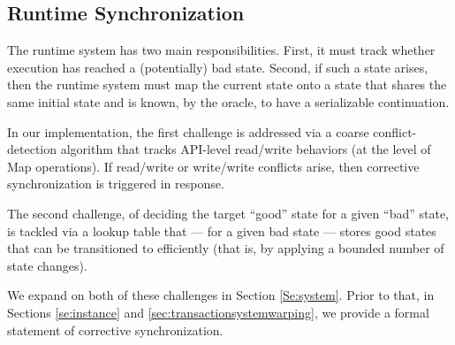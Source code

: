 \subsection{Runtime Synchronization} 

The runtime system has two main responsibilities. First, it must track whether execution has reached a (potentially) bad state. Second, if such a state arises, then the runtime system must map the current state onto a state that shares the same initial state and is known, by the oracle, to have a serializable continuation. 

In our implementation, the first challenge is addressed via a coarse conflict-detection algorithm that tracks API-level read/write behaviors (at the level of {\sf Map} operations). If read/write or write/write conflicts arise, then corrective synchronization is triggered in response. 

The second challenge, of deciding the target ``good'' state for a given ``bad'' state, is tackled via a lookup table that --- for a given bad state --- stores good states that can be transitioned to efficiently (that is, by applying a bounded number of state changes).

We expand on both of these challenges in Section \ref{Se:system}. Prior to that, in Sections \ref{se:instance} and \ref{sec:transactionsystemwarping}, we provide a formal statement of corrective synchronization.